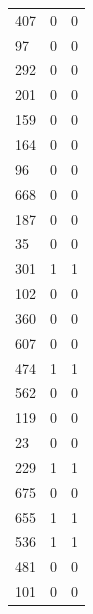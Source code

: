 \begin{tabular}{lrr}
407 & 0 & 0 \\
97 & 0 & 0 \\
292 & 0 & 0 \\
201 & 0 & 0 \\
159 & 0 & 0 \\
164 & 0 & 0 \\
96 & 0 & 0 \\
668 & 0 & 0 \\
187 & 0 & 0 \\
35 & 0 & 0 \\
301 & 1 & 1 \\
102 & 0 & 0 \\
360 & 0 & 0 \\
607 & 0 & 0 \\
474 & 1 & 1 \\
562 & 0 & 0 \\
119 & 0 & 0 \\
23 & 0 & 0 \\
229 & 1 & 1 \\
675 & 0 & 0 \\
655 & 1 & 1 \\
536 & 1 & 1 \\
481 & 0 & 0 \\
101 & 0 & 0 \\
\bottomrule
\end{tabular}

